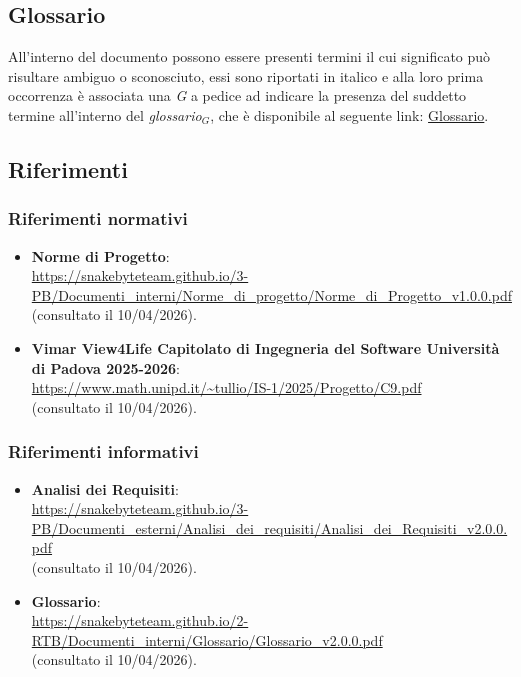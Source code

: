 \documentclass[10pt, letterpaper]{article}
\begin{document}
\subsection{Glossario}
All'interno del documento possono essere presenti termini il cui significato può risultare ambiguo o sconosciuto, essi sono
riportati in italico e alla loro prima occorrenza è associata una \textit{G} a pedice ad indicare la presenza del suddetto termine 
all'interno del \texorpdfstring{\textit{glossario}}{glossario}$_G$, che è disponibile al seguente link: \href{https://snakebyteteam.github.io/glossary.html}{Glossario}.

\subsection{Riferimenti}
\subsubsection{Riferimenti normativi}
\begin{itemize}
    \item \textbf{Norme di Progetto}:
          \\ \url{https://snakebyteteam.github.io/3-PB/Documenti_interni/Norme_di_progetto/Norme_di_Progetto_v1.0.0.pdf}
          \\ (consultato il 10/04/2026).
    \item \textbf{Vimar View4Life Capitolato di Ingegneria del Software Università di Padova 2025-2026}:
          \\ \url{https://www.math.unipd.it/~tullio/IS-1/2025/Progetto/C9.pdf}
          \\ (consultato il 10/04/2026).
\end{itemize}

\subsubsection{Riferimenti informativi}
\begin{itemize}
    \item \textbf{Analisi dei Requisiti}:
      \\ \url{https://snakebyteteam.github.io/3-PB/Documenti_esterni/Analisi_dei_requisiti/Analisi_dei_Requisiti_v2.0.0.pdf} 
      \\ (consultato il 10/04/2026).
    \item \textbf{Glossario}:
      \\ \url{https://snakebyteteam.github.io/2-RTB/Documenti_interni/Glossario/Glossario_v2.0.0.pdf} 
      \\ (consultato il 10/04/2026).
\end{itemize}
\end{document}
